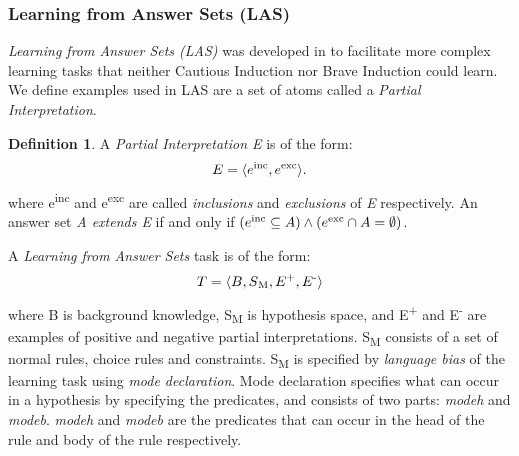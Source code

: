 \documentclass[11pt,twoside]{report}
\theoremstyle{plain}
\theoremstyle{definition}
\newtheorem{defn}[thm]{Definition} %
\begin{document}
\subsubsection{Learning from Answer Sets (LAS)}
\textit{Learning from Answer Sets (LAS)} was developed in \cite{Law2014} to facilitate more complex learning tasks that neither Cautious Induction nor Brave Induction could learn.
We define examples used in LAS are a set of atoms called a \textit{Partial Interpretation}.
\begin{defn}
A \textit{Partial Interpretation E} is of the form:
\begin{equation}
\begin{split}
E = \langle e\textsuperscript{inc}, e\textsuperscript{exc} \rangle. 
\end{split}
\label{partial_interpretations}
\end{equation}
where e\textsuperscript{inc} and e\textsuperscript{exc} are called \textit{inclusions} and \textit{exclusions} of \textit{E} respectively.
An answer set \textit{A extends E} if and only if $(e\textsuperscript{inc} \subseteq A) \wedge (e\textsuperscript{exc} \cap A = \emptyset)$.
\end{defn}

A \textit{Learning from Answer Sets} task is of the form:
\begin{equation}
\begin{split}
T = \langle B, S\textsubscript{M}, E\textsuperscript{+}, E\textsuperscript{-} \rangle
\end{split}
\label{las}
\end{equation}
where B is background knowledge, S\textsubscript{M} is hypothesis space, and E\textsuperscript{+} and E\textsuperscript{-} are examples of positive and negative partial interpretations. 
S\textsubscript{M} consists of a set of normal rules, choice rules and constraints. 
S\textsubscript{M} is specified by \textit{language bias} of the learning task using \textit{mode declaration}. 
Mode declaration specifies what can occur in a hypothesis by specifying the predicates, and consists of two parts: \textit{modeh} and \textit{modeb}. 
\textit{modeh} and \textit{modeb} are the predicates that can occur in the head of the rule and body of the rule respectively. 
\end{document}
